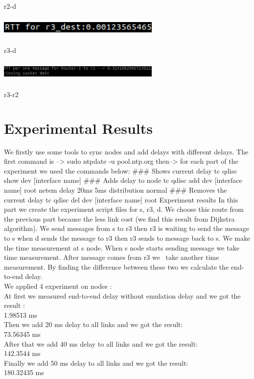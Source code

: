 \documentclass[letterpaper, 12 pt, conference]{ieeeconf}  %
\begin{document}
\begin{center}
r2-d
\end{center}



\includegraphics[width=8cm, height=1cm]{r3-dest.png}

\begin{center}
r3-d
\end{center}

\includegraphics[width=8cm, height=1cm]{r3-r2.png}

\begin{center}
r3-r2
\end{center}

\section{Experimental Results}


We firstly use some tools to sync nodes and add delays with different delays.
The first command is -->
   sudo  ntpdate -u pool.ntp.org
then-->
for each part of the experiment we used the commands below:
### Shows current delay
   tc qdisc show dev [interface name]  
### Adds delay to node
   tc qdisc add dev [interface name] root netem delay 20ms 5ms distribution normal
### Removes the current delay
   tc qdisc del dev [interface name] root
Experiment results
In this part we create the experiment script files for s, r3, d. We choose this route from the previous part because the less link cost (we find this result from Dijkstra algorithm). We send messages from s to r3 then r3 is waiting to send the message to s when d sends the message to r3 then r3 sends to message back to s. We make the time measurement at s node. When s node starts sending message we take time measurement. After message comes from r3 we  take another time measurement. By finding the difference between these two we calculate the end-to-end delay.\\
We applied 4 experiment on nodes :\\
At first we measured end-to-end delay without emulation delay and we got the result :\\ 1.98513 ms\\
Then we add 20 ms delay to all links and we got the result:\\
73.56345 ms\\
After that we add 40 ms delay to all links and we got the result:\\
142.3544 ms\\
Finally we add 50 ms delay to all links and we got the result:\\
180.32435 ms\\
\end{document}
